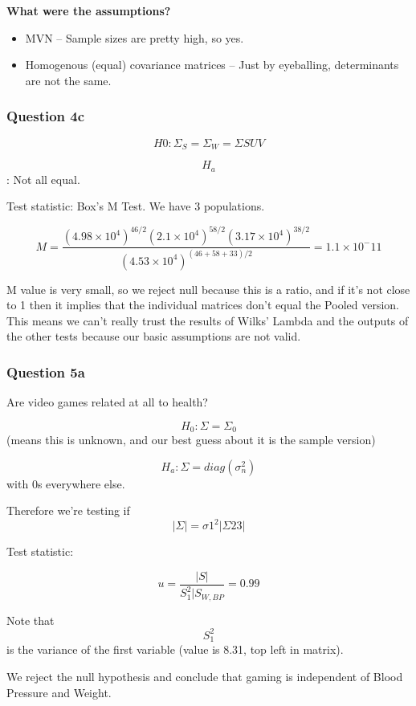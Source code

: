 \textbf{What were the assumptions?}

\begin{itemize}
\tightlist
\item
  MVN -- Sample sizes are pretty high, so yes.
\item
  Homogenous (equal) covariance matrices -- Just by eyeballing,
  determinants are not the same.
\end{itemize}

\hypertarget{question-4c}{%
\subsubsection{Question 4c}\label{question-4c}}

\[H0: \Sigma_S = \Sigma_W = \Sigma{SUV}\]

\[H_a\]: Not all equal.

Test statistic: Box's M Test. We have 3 populations.

\[M = \frac{(4.98 \times 10^4)^{46/2}(2.1 \times 10^4)^{58/2}(3.17 \times 10^4)^{38/2}}{(4.53 \times 10^4)^{(46+58+33)/2}} = 1.1 \times 10^-11\]

M value is very small, so we reject null because this is a ratio, and if
it's not close to 1 then it implies that the individual matrices don't
equal the Pooled version. This means we can't really trust the results
of Wilks' Lambda and the outputs of the other tests because our basic
assumptions are not valid.

\hypertarget{question-5a}{%
\subsubsection{Question 5a}\label{question-5a}}

Are video games related at all to health?

\[H_0: \Sigma = \Sigma_0 \] (means this is unknown, and our best guess
about it is the sample version)

\[H_a: \Sigma = diag(\sigma_n^2) \] with 0s everywhere else.

Therefore we're testing if \[ | \Sigma | = \sigma1^2 | \Sigma{23} | \]

Test statistic:

\[u = \frac{|S|}{S_1^2 |S_{W, BP}} = 0.99\]

Note that \[S_1^2\] is the variance of the first variable (value is
8.31, top left in matrix).

We reject the null hypothesis and conclude that gaming is independent of
Blood Pressure and Weight.

